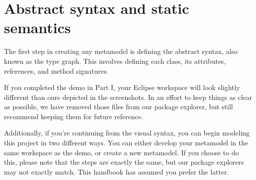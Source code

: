 \newpage
\section{Abstract syntax and static semantics}
\genHeader
\label{sec: staticSemantics}

The first step in creating any metamodel is defining the abstract syntax, also known as the type graph. This involves defining each class, its attributes,
references, and method signatures.

If you completed the demo in Part I, your Eclipse workspace will look slightly different than ours depicted in the screenshots. In an effort to keep things as
clear as possible, we have removed those files from our package explorer, but still recommend keeping them for future reference. 

Additionally, if you're continuing from the visual syntax, you can begin modeling this project in two different ways. You can either develop your metamodel in
the same workspace as the demo, or create a new metamodel. If you choose to do this, please note that the steps are exactly the same, but our package explorers
may not exactly match. This handbook has assumed you prefer the latter.
















 
